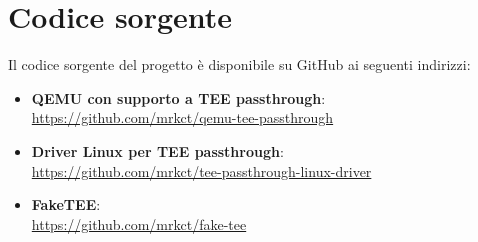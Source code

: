 \documentclass[12pt,italian]{report}
\begin{document}
\chapter{Codice sorgente}
\label{app:codice-sorgente}
Il codice sorgente del progetto è disponibile su GitHub ai seguenti indirizzi:

\begin{itemize}
    \item 
        \textbf{QEMU con supporto a TEE passthrough}: \\
        \noindent 
        \url{https://github.com/mrkct/qemu-tee-passthrough}
    \item
        \textbf{Driver Linux per TEE passthrough}: \\ 
        \noindent
        \url{https://github.com/mrkct/tee-passthrough-linux-driver}
    \item
        \textbf{FakeTEE}: \\
        \noindent
        \url{https://github.com/mrkct/fake-tee}
\end{itemize}



\end{document}
